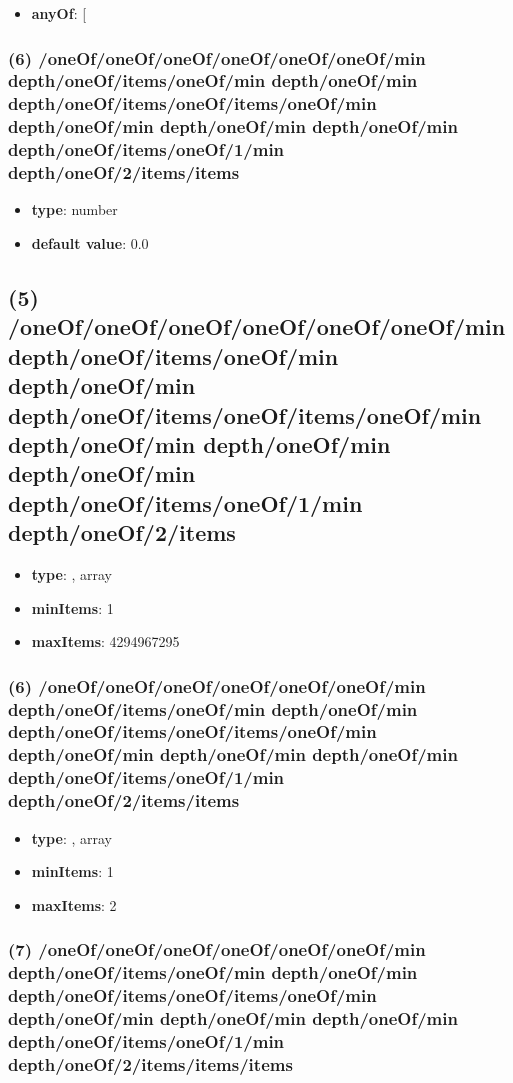 \begin{itemize}[leftmargin=6em]\item {\bf anyOf}: [\end{itemize}\subsubsection{(6) /oneOf/oneOf/oneOf/oneOf/oneOf/oneOf/min depth/oneOf/items/oneOf/min depth/oneOf/min depth/oneOf/items/oneOf/items/oneOf/min depth/oneOf/min depth/oneOf/min depth/oneOf/min depth/oneOf/items/oneOf/1/min depth/oneOf/2/items/items}
\begin{itemize}[leftmargin=6em]\item {\bf type}: number\item {\bf default value}: 0.0
\end{itemize}\subsection{(5) /oneOf/oneOf/oneOf/oneOf/oneOf/oneOf/min depth/oneOf/items/oneOf/min depth/oneOf/min depth/oneOf/items/oneOf/items/oneOf/min depth/oneOf/min depth/oneOf/min depth/oneOf/min depth/oneOf/items/oneOf/1/min depth/oneOf/2/items}
\begin{itemize}[leftmargin=5em]\item {\bf type}: , array\item {\bf minItems}: 1
\item {\bf maxItems}: 4294967295
\end{itemize}\subsubsection{(6) /oneOf/oneOf/oneOf/oneOf/oneOf/oneOf/min depth/oneOf/items/oneOf/min depth/oneOf/min depth/oneOf/items/oneOf/items/oneOf/min depth/oneOf/min depth/oneOf/min depth/oneOf/min depth/oneOf/items/oneOf/1/min depth/oneOf/2/items/items}
\begin{itemize}[leftmargin=6em]\item {\bf type}: , array\item {\bf minItems}: 1
\item {\bf maxItems}: 2
\end{itemize}\subsubsection{(7) /oneOf/oneOf/oneOf/oneOf/oneOf/oneOf/min depth/oneOf/items/oneOf/min depth/oneOf/min depth/oneOf/items/oneOf/items/oneOf/min depth/oneOf/min depth/oneOf/min depth/oneOf/min depth/oneOf/items/oneOf/1/min depth/oneOf/2/items/items/items}
